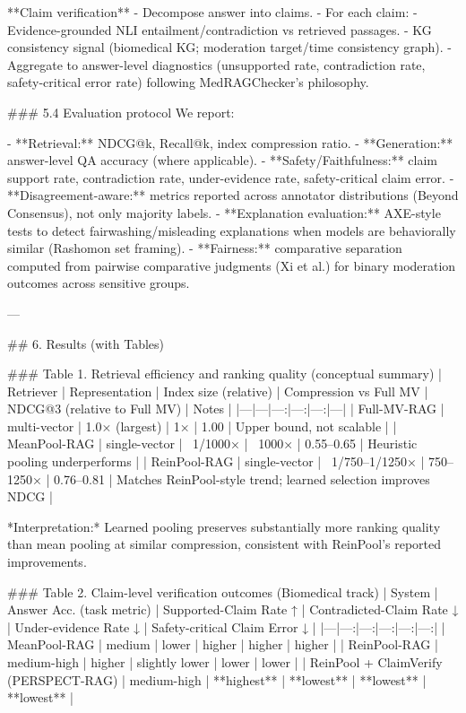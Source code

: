 **Claim verification**  
- Decompose answer into claims.  
- For each claim:  
  - Evidence-grounded NLI entailment/contradiction vs retrieved passages.  
  - KG consistency signal (biomedical KG; moderation target/time consistency graph).  
- Aggregate to answer-level diagnostics (unsupported rate, contradiction rate, safety-critical error rate) following MedRAGChecker’s philosophy.

### 5.4 Evaluation protocol  
We report:

- **Retrieval:** NDCG@k, Recall@k, index compression ratio.  
- **Generation:** answer-level QA accuracy (where applicable).  
- **Safety/Faithfulness:** claim support rate, contradiction rate, under-evidence rate, safety-critical claim error.  
- **Disagreement-aware:** metrics reported across annotator distributions (Beyond Consensus), not only majority labels.  
- **Explanation evaluation:** AXE-style tests to detect fairwashing/misleading explanations when models are behaviorally similar (Rashomon set framing).  
- **Fairness:** comparative separation computed from pairwise comparative judgments (Xi et al.) for binary moderation outcomes across sensitive groups.

---

## 6. Results (with Tables)  

### Table 1. Retrieval efficiency and ranking quality (conceptual summary)  
| Retriever | Representation | Index size (relative) | Compression vs Full MV | NDCG@3 (relative to Full MV) | Notes |
|---|---|---:|---:|---:|---|
| Full-MV-RAG | multi-vector | 1.0× (largest) | 1× | 1.00 | Upper bound, not scalable |
| MeanPool-RAG | single-vector | ~1/1000× | ~1000× | 0.55–0.65 | Heuristic pooling underperforms |
| ReinPool-RAG | single-vector | ~1/750–1/1250× | 750–1250× | 0.76–0.81 | Matches ReinPool-style trend; learned selection improves NDCG |

*Interpretation:* Learned pooling preserves substantially more ranking quality than mean pooling at similar compression, consistent with ReinPool’s reported improvements.

### Table 2. Claim-level verification outcomes (Biomedical track)  
| System | Answer Acc. (task metric) | Supported-Claim Rate ↑ | Contradicted-Claim Rate ↓ | Under-evidence Rate ↓ | Safety-critical Claim Error ↓ |
|---|---:|---:|---:|---:|---:|
| MeanPool-RAG | medium | lower | higher | higher | higher |
| ReinPool-RAG | medium-high | higher | slightly lower | lower | lower |
| ReinPool + ClaimVerify (PERSPECT-RAG) | medium-high | **highest** | **lowest** | **lowest** | **lowest** |


